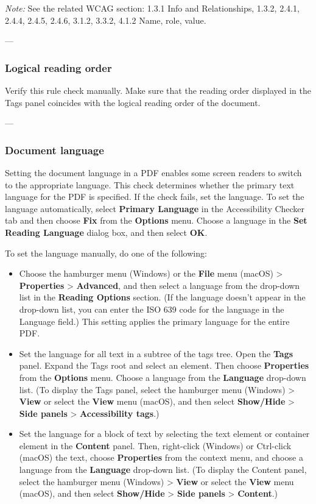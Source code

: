 \vspace{0.5em}
\noindent\textit{Note:} See the related WCAG section: 1.3.1 Info and Relationships, 1.3.2, 2.4.1, 2.4.4, 2.4.5, 2.4.6, 3.1.2, 3.3.2, 4.1.2 Name, role, value\footnotemark[1].

---

\subsubsection*{Logical reading order}
Verify this rule check manually. Make sure that the reading order displayed in the Tags panel coincides with the logical reading order of the document\footnotemark[1].

---

\subsubsection*{Document language}
Setting the document language in a PDF enables some screen readers to switch to the appropriate language. This check determines whether the primary text language for the PDF is specified. If the check fails, set the language\footnotemark[1].
To set the language automatically, select \textbf{Primary Language} in the Accessibility Checker tab and then choose \textbf{Fix} from the \textbf{Options} menu. Choose a language in the \textbf{Set Reading Language} dialog box, and then select \textbf{OK}.

To set the language manually, do one of the following:
\begin{itemize}
    \item Choose the hamburger menu (Windows) or the \textbf{File} menu (macOS) > \textbf{Properties} > \textbf{Advanced}, and then select a language from the drop-down list in the \textbf{Reading Options} section. (If the language doesn't appear in the drop-down list, you can enter the ISO 639 code for the language in the Language field.) This setting applies the primary language for the entire PDF.
    \item Set the language for all text in a subtree of the tags tree. Open the \textbf{Tags} panel. Expand the Tags root and select an element. Then choose \textbf{Properties} from the \textbf{Options} menu. Choose a language from the \textbf{Language} drop-down list. (To display the Tags panel, select the hamburger menu (Windows) > \textbf{View} or select the \textbf{View} menu (macOS), and then select \textbf{Show/Hide} > \textbf{Side panels} > \textbf{Accessibility tags}.)
    \item Set the language for a block of text by selecting the text element or container element in the \textbf{Content} panel. Then, right-click (Windows) or Ctrl-click (macOS) the text, choose \textbf{Properties} from the context menu, and choose a language from the \textbf{Language} drop-down list. (To display the Content panel, select the hamburger menu (Windows) > \textbf{View} or select the \textbf{View} menu (macOS), and then select \textbf{Show/Hide} > \textbf{Side panels} > \textbf{Content}.)
\end{itemize}

